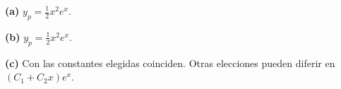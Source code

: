 \noindent\textbf{(a)} \(y_p=\tfrac12x^2e^x\).

\noindent\textbf{(b)} \(y_p=\tfrac12x^2e^x\).

\noindent\textbf{(c)} Con las constantes elegidas coinciden. Otras elecciones pueden diferir en \((C_1+C_2x)e^x\).
